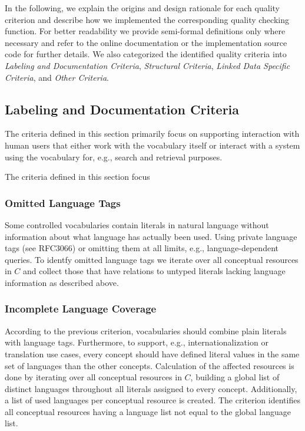 
In the following, we explain the origins and design rationale for each quality criterion and describe how we implemented the corresponding quality checking function. For better readability we provide semi-formal definitions only where necessary and refer to the online documentation or the implementation source code for further details. We also categorized the identified quality criteria into \emph{Labeling and Documentation Criteria}, \emph{Structural Criteria}, \emph{Linked Data Specific Criteria}, and \emph{Other Criteria}. 


\subsection{Labeling and Documentation Criteria}

The criteria defined in this section primarily focus on supporting interaction with human users that either work with the vocabulary itself or interact with a system using the vocabulary for, e.g., search and retrieval purposes.

The criteria defined in this section focus 

\subsubsection{Omitted Language Tags}
Some controlled vocabularies contain literals in natural language without information about what language has actually been used. Using private language tags (see RFC3066) or omitting them at all limits, e.g., language-dependent queries. To identfy omitted language tags we iterate over all conceptual resources in $C$ and collect those that have relations to untyped literals lacking language information as described above. 

\subsubsection{Incomplete Language Coverage}
According to the previous criterion, vocabularies should combine plain literals with language tags. Furthermore, to support, e.g., internationalization or translation use cases, every concept should have defined literal values in the same set of languages than the other concepts. Calculation of the affected resources is done by iterating over all conceptual resources in $C$, building a global list of distinct languages throughout all literals assigned to every concept. Additionally, a list of used languages per conceptual resource is created. The criterion identifies all conceptual resources having a language list not equal to the global language list. 

